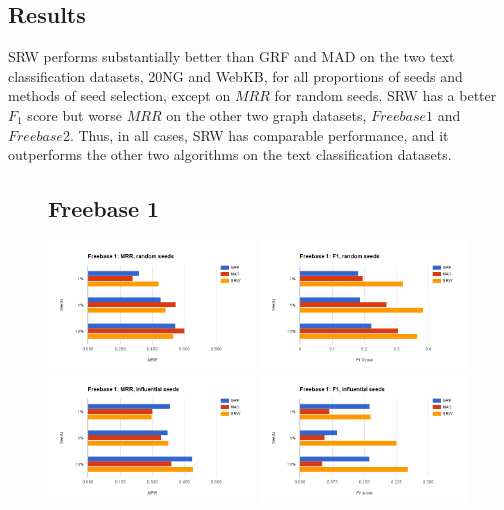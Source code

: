 \documentclass[12pt]{article}
\begin{document}
\subsection{Results}
SRW performs substantially better than GRF and MAD on the two text classification datasets, 20NG and WebKB, for all proportions of seeds and methods of seed selection, except on $MRR$ for random seeds.
SRW has a better $F_1$ score but worse $MRR$ on the other two graph datasets, $Freebase 1$ and $Freebase 2$.
Thus, in all cases, SRW has comparable performance, and it outperforms the other two algorithms on the text classification datasets.

\begin{figure}[p]
    \subsection{Freebase 1}
    \centering
    \includegraphics[width=0.49\textwidth]{figures/freebase1-mrr-random}
    \includegraphics[width=0.49\textwidth]{figures/freebase1-f1-random}
    \includegraphics[width=0.49\textwidth]{figures/freebase1-mrr-top}
    \includegraphics[width=0.49\textwidth]{figures/freebase1-f1-top}

\end{figure}
\end{document}
